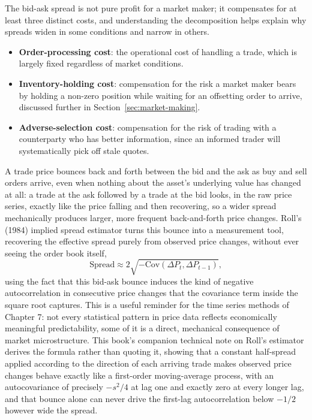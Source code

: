 \documentclass[../ai_in_finance]{subfiles}
\begin{document}
The bid-ask spread is not pure profit for a market maker; it compensates for at least three distinct costs, and understanding the decomposition helps explain why spreads widen in some conditions and narrow in others.
\begin{itemize}
    \item \textbf{Order-processing cost}: the operational cost of handling a trade, which is largely fixed regardless of market conditions.
    \item \textbf{Inventory-holding cost}: compensation for the risk a market maker bears by holding a non-zero position while waiting for an offsetting order to arrive, discussed further in Section~\ref{sec:market-making}.
    \item \textbf{Adverse-selection cost}: compensation for the risk of trading with a counterparty who has better information, since an informed trader will systematically pick off stale quotes.
\end{itemize}
A trade price bounces back and forth between the bid and the ask as buy and sell orders arrive, even when nothing about the asset's underlying value has changed at all: a trade at the ask followed by a trade at the bid looks, in the raw price series, exactly like the price falling and then recovering, so a wider spread mechanically produces larger, more frequent back-and-forth price changes. Roll's (1984) implied spread estimator turns this bounce into a measurement tool, recovering the effective spread purely from observed price changes, without ever seeing the order book itself,
\begin{equation*}
\text{Spread} \approx 2\sqrt{-\text{Cov}(\Delta P_t, \Delta P_{t-1})},
\end{equation*}
using the fact that this bid-ask bounce induces the kind of negative autocorrelation in consecutive price changes that the covariance term inside the square root captures. This is a useful reminder for the time series methods of Chapter 7: not every statistical pattern in price data reflects economically meaningful predictability, some of it is a direct, mechanical consequence of market microstructure. This book's companion technical note on Roll's estimator derives the formula rather than quoting it, showing that a constant half-spread applied according to the direction of each arriving trade makes observed price changes behave exactly like a first-order moving-average process, with an autocovariance of precisely $-s^2/4$ at lag one and exactly zero at every longer lag, and that bounce alone can never drive the first-lag autocorrelation below $-1/2$ however wide the spread.
\end{document}
